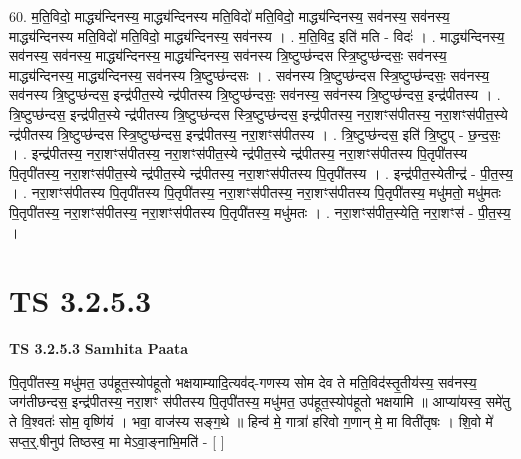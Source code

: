 \documentclass[17pt]{extarticle}
\begin{document}
60. म॒ति॒विदो॒ माद्ध्य॑न्दिनस्य॒ माद्ध्य॑न्दिनस्य मति॒विदो॑ मति॒विदो॒ माद्ध्य॑न्दिनस्य॒ सव॑नस्य॒ सव॑नस्य॒ माद्ध्य॑न्दिनस्य मति॒विदो॑ मति॒विदो॒ माद्ध्य॑न्दिनस्य॒ सव॑नस्य । . म॒ति॒विद॒ इति॑ मति - विदः॑ । . माद्ध्य॑न्दिनस्य॒ सव॑नस्य॒ सव॑नस्य॒ माद्ध्य॑न्दिनस्य॒ माद्ध्य॑न्दिनस्य॒ सव॑नस्य त्रि॒ष्टुप्छ॑न्दस स्त्रि॒ष्टुप्छ॑न्दसः॒ सव॑नस्य॒ माद्ध्य॑न्दिनस्य॒ माद्ध्य॑न्दिनस्य॒ सव॑नस्य त्रि॒ष्टुप्छ॑न्दसः । . सव॑नस्य त्रि॒ष्टुप्छ॑न्दस स्त्रि॒ष्टुप्छ॑न्दसः॒ सव॑नस्य॒ सव॑नस्य त्रि॒ष्टुप्छ॑न्दस॒ इन्द्र॑पीत॒स्ये न्द्र॑पीतस्य त्रि॒ष्टुप्छ॑न्दसः॒ सव॑नस्य॒ सव॑नस्य त्रि॒ष्टुप्छ॑न्दस॒ इन्द्र॑पीतस्य । . त्रि॒ष्टुप्छ॑न्दस॒ इन्द्र॑पीत॒स्ये न्द्र॑पीतस्य त्रि॒ष्टुप्छ॑न्दस स्त्रि॒ष्टुप्छ॑न्दस॒ इन्द्र॑पीतस्य॒ नरा॒शꣳस॑पीतस्य॒ नरा॒शꣳस॑पीत॒स्ये न्द्र॑पीतस्य त्रि॒ष्टुप्छ॑न्दस स्त्रि॒ष्टुप्छ॑न्दस॒ इन्द्र॑पीतस्य॒ नरा॒शꣳस॑पीतस्य । . त्रि॒ष्टुप्छ॑न्दस॒ इति॑ त्रि॒ष्टुप् - छ॒न्द॒सः॒ । . इन्द्र॑पीतस्य॒ नरा॒शꣳस॑पीतस्य॒ नरा॒शꣳस॑पीत॒स्ये न्द्र॑पीत॒स्ये न्द्र॑पीतस्य॒ नरा॒शꣳस॑पीतस्य पि॒तृपी॑तस्य पि॒तृपी॑तस्य॒ नरा॒शꣳस॑पीत॒स्ये न्द्र॑पीत॒स्ये न्द्र॑पीतस्य॒ नरा॒शꣳस॑पीतस्य पि॒तृपी॑तस्य । . इन्द्र॑पीत॒स्येतीन्द्र॑ - पी॒त॒स्य॒ । . नरा॒शꣳस॑पीतस्य पि॒तृपी॑तस्य पि॒तृपी॑तस्य॒ नरा॒शꣳस॑पीतस्य॒ नरा॒शꣳस॑पीतस्य पि॒तृपी॑तस्य॒ मधु॑मतो॒ मधु॑मतः पि॒तृपी॑तस्य॒ नरा॒शꣳस॑पीतस्य॒ नरा॒शꣳस॑पीतस्य पि॒तृपी॑तस्य॒ मधु॑मतः । . नरा॒शꣳस॑पीत॒स्येति॒ नरा॒शꣳस॑ - पी॒त॒स्य॒ । \newline
\pagebreak
{}

\section{ TS 3.2.5.3 }

\textbf{TS 3.2.5.3 } \newline
\textbf{Samhita Paata} \newline

पि॒तृपी॑तस्य॒ मधु॑मत॒ उप॑हूत॒स्योप॑हूतो भक्षयाम्यादि॒त्यव॑द्-गणस्य सोम देव ते मति॒विद॑स्तृ॒तीय॑स्य॒ सव॑नस्य॒ जग॑तीछन्दस॒ इन्द्र॑पीतस्य॒ नरा॒शꣳ स॑पीतस्य पि॒तृपी॑तस्य॒ मधु॑मत॒ उप॑हूत॒स्योप॑हूतो भक्षयामि ॥ आप्या॑यस्व॒ समे॑तु ते वि॒श्वतः॑ सोम॒ वृष्णि॑यं । भवा॒ वाज॑स्य सङ्ग॒थे ॥ हिन्व॑ मे॒ गात्रा॑ हरिवो ग॒णान् मे॒ मा विती॑तृषः । शि॒वो मे॑ सप्त॒र्॒.षीनुप॑ तिष्ठस्व॒ मा मेऽवा॒ङ्नाभि॒मति॑ - [  ] \newline
\end{document}
